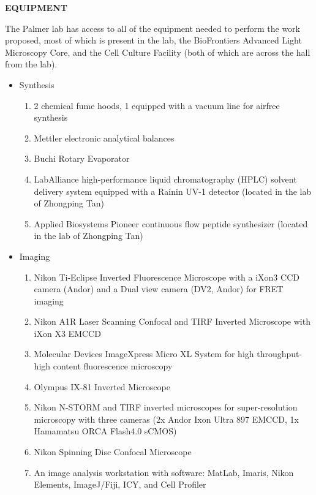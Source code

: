 


\begin{center}
\bf EQUIPMENT
\end{center}

The Palmer lab has access to all of the equipment needed to perform the work proposed, most of which is present in the lab, the BioFrontiers Advanced Light Microscopy Core, and the Cell Culture Facility (both of which are across the hall from the lab).

\begin{itemize}
  \item Synthesis \begin{enumerate}
    \item 2 chemical fume hoods, 1 equipped with a vacuum line for airfree synthesis
    \item Mettler electronic analytical balances
    \item Buchi Rotary Evaporator %
    \item LabAlliance high-performance liquid chromatography (HPLC) solvent delivery system equipped with a Rainin UV-1 detector (located in the lab of Zhongping Tan)
    \item Applied Biosystems Pioneer continuous flow peptide synthesizer (located in the lab of Zhongping Tan)
  \end{enumerate}
  \item Imaging \begin{enumerate}
    \item Nikon Ti-Eclipse Inverted Fluorescence Microscope with a iXon3 CCD camera (Andor) and a Dual view camera (DV2, Andor) for FRET imaging
    \item Nikon A1R Laser Scanning Confocal and TIRF Inverted Microscope with iXon X3 EMCCD
    \item Molecular Devices ImageXpress Micro XL System for high throughput-high content fluorescence microscopy
    \item Olympus IX-81 Inverted Microscope
    \item Nikon N-STORM and TIRF inverted microscopes for super-resolution microscopy with three cameras (2x Andor Ixon Ultra 897 EMCCD, 1x Hamamatsu ORCA Flash4.0 sCMOS)
    \item Nikon Spinning Disc Confocal Microscope
    \item An image analysis workstation with software: MatLab, Imaris, Nikon Elements, ImageJ/Fiji, ICY, and Cell Profiler

\end{enumerate}
\end{itemize}
